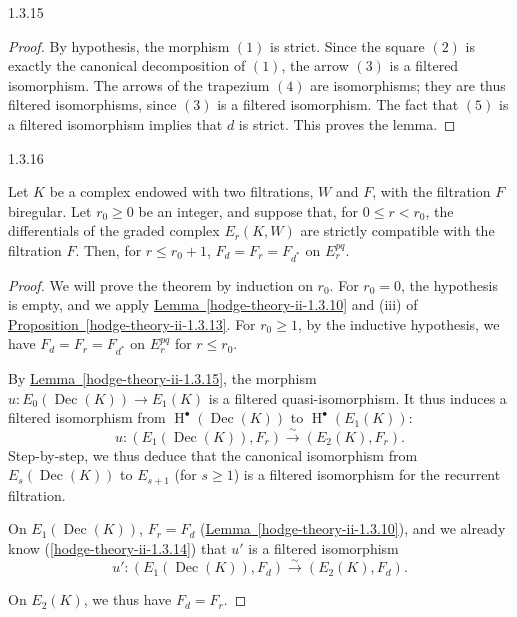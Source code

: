 \begin{lemma}{1.3.15}
\begin{proof}
      By hypothesis, the morphism \((1)\) is strict.
      Since the square \((2)\) is exactly the canonical decomposition of \((1)\), the arrow \((3)\) is a filtered isomorphism.
      The arrows of the trapezium \((4)\) are isomorphisms;
      they are thus filtered isomorphisms, since \((3)\) is a filtered isomorphism.
      The fact that \((5)\) is a filtered isomorphism implies that \(d\) is strict.
      This proves the lemma.\end{proof}\end{lemma}\begin{theorem}{1.3.16}\label{hodge-theory-ii-1.3.16}\skipsinglepar\par{}Let \(K\) be a complex endowed with two filtrations, \(W\) and \(F\), with the filtration \(F\) biregular.
    Let \(r_0\geqslant 0\) be an integer, and suppose that, for \(0\leqslant  r<r_0\), the differentials of the graded complex \(E_r(K,W)\) are strictly compatible with the filtration \(F\).
    Then, for \(r\leqslant  r_0+1\), \(F_d=F_r=F_{d^*}\) on \(E_r^{pq}\).\begin{proof}\par{}We will prove the theorem by induction on \(r_0\).
      For \(r_0=0\), the hypothesis is empty, and we apply \hyperref[hodge-theory-ii-1.3.10]{Lemma~\ref*{hodge-theory-ii-1.3.10}} and (iii) of \hyperref[hodge-theory-ii-1.3.13]{Proposition~\ref*{hodge-theory-ii-1.3.13}}.
      For \(r_0\geqslant 1\), by the inductive hypothesis, we have \(F_d=F_r=F_{d^*}\) on \(E_r^{pq}\) for \(r\leqslant  r_0\).\par{}By \hyperref[hodge-theory-ii-1.3.15]{Lemma~\ref*{hodge-theory-ii-1.3.15}}, the morphism \(u\colon  E_0(\operatorname {Dec}(K))\to  E_1(K)\) is a filtered quasi-isomorphism.
      It thus induces a filtered isomorphism from \(\operatorname {H}^\bullet (\operatorname {Dec}(K))\) to \(\operatorname {H}^\bullet (E_1(K))\):
      \[         u\colon  (E_1(\operatorname {Dec}(K)),F_r)         \xrightarrow {\sim } (E_2(K),F_r).       \]
      Step-by-step, we thus deduce that the canonical isomorphism from \(E_s(\operatorname {Dec}(K))\) to \(E_{s+1}\) (for \(s\geqslant 1\)) is a filtered isomorphism for the recurrent filtration.\par{}On \(E_1(\operatorname {Dec}(K))\), \(F_r=F_d\) (\hyperref[hodge-theory-ii-1.3.10]{Lemma~\ref*{hodge-theory-ii-1.3.10}}), and we already know (\cref{hodge-theory-ii-1.3.14}) that \(u'\) is a filtered isomorphism
      \[         u'\colon  (E_1(\operatorname {Dec}(K)),F_d)         \xrightarrow {\sim } (E_2(K),F_d).       \]\par{}On \(E_2(K)\), we thus have \(F_d=F_r\).

\end{proof}
\end{theorem}
